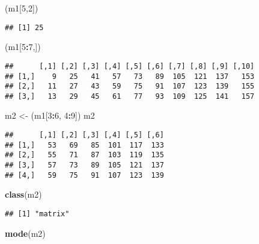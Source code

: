 \documentclass[]{article}
\newenvironment{Shaded}{\begin{snugshade}}{\end{snugshade}}
\newcommand{\DecValTok}[1]{\textcolor[rgb]{0.00,0.00,0.81}{#1}}
\newcommand{\KeywordTok}[1]{\textcolor[rgb]{0.13,0.29,0.53}{\textbf{#1}}}
\newcommand{\NormalTok}[1]{#1}
\newcommand{\OperatorTok}[1]{\textcolor[rgb]{0.81,0.36,0.00}{\textbf{#1}}}
\newcommand{\StringTok}[1]{\textcolor[rgb]{0.31,0.60,0.02}{#1}}
\begin{document}
\begin{Shaded}
\begin{Highlighting}[]
\NormalTok{(m1[}\DecValTok{5}\NormalTok{,}\DecValTok{2}\NormalTok{])}
\end{Highlighting}
\end{Shaded}

\begin{verbatim}
## [1] 25
\end{verbatim}

\begin{Shaded}
\begin{Highlighting}[]
\NormalTok{(m1[}\DecValTok{5}\OperatorTok{:}\DecValTok{7}\NormalTok{,])}
\end{Highlighting}
\end{Shaded}

\begin{verbatim}
##      [,1] [,2] [,3] [,4] [,5] [,6] [,7] [,8] [,9] [,10]
## [1,]    9   25   41   57   73   89  105  121  137   153
## [2,]   11   27   43   59   75   91  107  123  139   155
## [3,]   13   29   45   61   77   93  109  125  141   157
\end{verbatim}

\begin{Shaded}
\begin{Highlighting}[]
\NormalTok{m2 <-}\StringTok{ }\NormalTok{(m1[}\DecValTok{3}\OperatorTok{:}\DecValTok{6}\NormalTok{, }\DecValTok{4}\OperatorTok{:}\DecValTok{9}\NormalTok{])}
\NormalTok{m2}
\end{Highlighting}
\end{Shaded}

\begin{verbatim}
##      [,1] [,2] [,3] [,4] [,5] [,6]
## [1,]   53   69   85  101  117  133
## [2,]   55   71   87  103  119  135
## [3,]   57   73   89  105  121  137
## [4,]   59   75   91  107  123  139
\end{verbatim}

\begin{Shaded}
\begin{Highlighting}[]
\KeywordTok{class}\NormalTok{(m2)}
\end{Highlighting}
\end{Shaded}

\begin{verbatim}
## [1] "matrix"
\end{verbatim}

\begin{Shaded}
\begin{Highlighting}[]
\KeywordTok{mode}\NormalTok{(m2)}
\end{Highlighting}
\end{Shaded}
\end{document}
